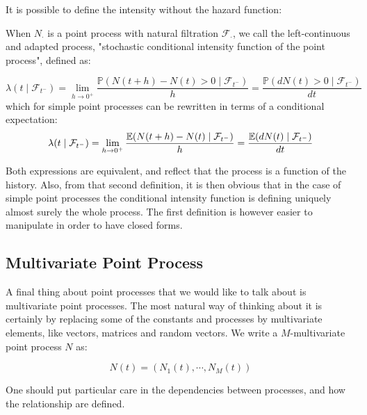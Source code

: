 \documentclass[11pt]{book}
\begin{document}
It is possible to define the intensity without the hazard function:


\begin{definition}
When $N_{\cdot}$ is a point process with natural filtration $\mathcal F_{\cdot}$, we call the left-continuous and adapted process, "stochastic conditional intensity function of the point process", defined as:

\begin{equation}
 \lambda(t \mid \mathcal F_{t^-} ) = \lim_{h \to 0^+ } \frac{\mathbb P( N(t+h) - N(t) > 0 \mid \mathcal F_{t^-} )} {h} = \frac{\mathbb P ( dN(t) > 0  \mid \mathcal F_{t^-}) }{dt}
\end{equation}
which for simple point processes can be rewritten in terms of a conditional expectation:
\begin{equation}
 \lambda(t \mid \mathcal F_{t^-} ) = \lim_{h \to 0^+ } \frac{\mathbb E( N(t+h) - N(t)  \mid \mathcal F_{t^-} )} {h} = \frac{\mathbb E ( dN(t)  \mid \mathcal F_{t^-}) }{dt}
\label{eq:conditional_filtration}
\end{equation}
\end{definition}

Both expressions are equivalent, and reflect that the process is a function of the history. Also, from that second definition, it is then obvious that in the case of simple point processes the conditional intensity function is defining uniquely almost surely the whole process. The first definition is however easier to manipulate in order to have closed forms.


\subsection{Multivariate Point Process}
A final thing about point processes that we would like to talk about is multivariate point processes. The most natural way of thinking about it is certainly by replacing some of the constants and processes by multivariate elements, like vectors, matrices and random vectors. We write a $M$-multivariate point process $N$ as:

\begin{equation}
N(t) = \left ( N_1(t), \cdots, N_M(t) \right )
\end{equation}

One should put particular care in the dependencies between processes, and how the relationship are defined. 
\end{document}
